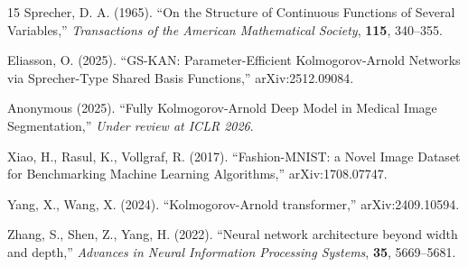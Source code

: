 \documentclass{article}
\theoremstyle{plain}
\theoremstyle{definition}
\theoremstyle{remark}
\begin{document}
\begin{thebibliography}{15}
Sprecher, D. A. (1965). ``On the Structure of Continuous Functions of Several Variables,'' \emph{Transactions of the American Mathematical Society}, \textbf{115}, 340--355.

Eliasson, O. (2025). ``GS-KAN: Parameter-Efficient Kolmogorov-Arnold Networks via Sprecher-Type Shared Basis Functions,'' arXiv:2512.09084.

Anonymous (2025). ``Fully Kolmogorov-Arnold Deep Model in Medical Image Segmentation,'' \emph{Under review at ICLR 2026}.

Xiao, H., Rasul, K., Vollgraf, R. (2017). ``Fashion-MNIST: a Novel Image Dataset for Benchmarking Machine Learning Algorithms,'' arXiv:1708.07747.

Yang, X., Wang, X. (2024). ``Kolmogorov-Arnold transformer,'' arXiv:2409.10594.

Zhang, S., Shen, Z., Yang, H. (2022). ``Neural network architecture beyond width and depth,'' \emph{Advances in Neural Information Processing Systems}, \textbf{35}, 5669--5681.

\end{thebibliography}
\end{document}
